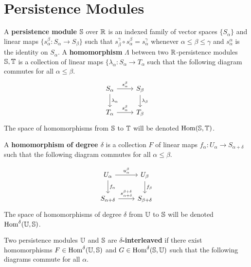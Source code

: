 
\section{Persistence Modules}

A \textbf{persistence module} $\S$ over $\R$ is an indexed family of vector spaces $\{S_\alpha\}$ and linear maps $\{s_\alpha^\beta : S_\alpha\to S_\beta\}$ such that $s^\gamma_\beta\circ s_\alpha^\beta = s_\alpha^\gamma$ whenever $\alpha\leq\beta\leq\gamma$ and $s_\alpha^\alpha$ is the identity on $S_\alpha$.
A \textbf{homomorphism} $\Lambda$ between two $\R$-persistence modules $\S, \T$ is a collection of linear maps $\{\lambda_\alpha : S_\alpha\to T_\alpha$ such that the following diagram commutes for all $\alpha\leq\beta$.
\begin{equation}\label{dgm:homomorphism}
  \begin{tikzcd}
    S_\alpha\arrow{r}{s_\alpha^\beta}\arrow{d}{\lambda_\alpha} &
    S_\beta\arrow{d}{\lambda_\beta}\\
    T_\alpha\arrow{r}{s_\alpha^\beta} &
    T_\beta
\end{tikzcd}\end{equation}
The space of homomorphisms from $\S$ to $\T$ will be denoted $\Hom(\S, \T)$.

A \textbf{homomorphism of degree $\delta$} is a collection $F$ of linear maps $f_\alpha : U_\alpha\to S_{\alpha+\delta}$ such that the following diagram commutes for all $\alpha\leq\beta$.

\begin{equation}\label{dgm:shifted_homomorphism}
  \begin{tikzcd}
    U_\alpha\arrow{r}{u_\alpha^\beta}\arrow{d}{f_\alpha} &
    U_\beta\arrow{d}{f_\beta}\\
    S_{\alpha+\delta}\arrow{r}{s_{\alpha+\delta}^{\beta+\delta}} &
    S_{\beta +\delta}
\end{tikzcd}\end{equation}
The space of homomorphisms of degree $\delta$ from $\U$ to $\S$ will be denoted $\Hom^\delta(\U, \S)$.

Two persistence modules $\U$ and $\S$ are \textbf{$\delta$-interleaved} if there exist homomorphisms $F\in\Hom^\delta(\U, \S)$ and $G \in\Hom^\delta(\S,\U)$ such that the following diagrams commute for all $\alpha$.

